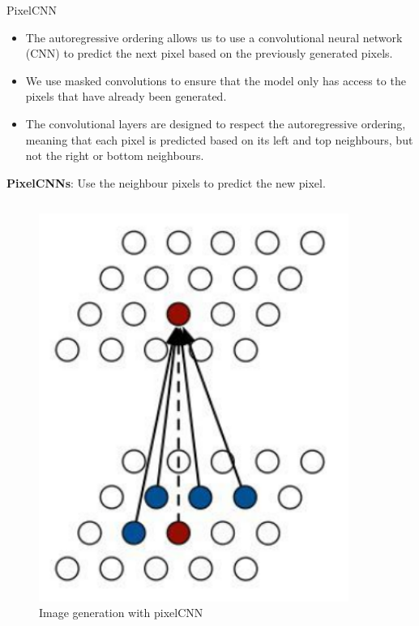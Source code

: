 \begin{frame}[allowframebreaks]{PixelCNN}
\framebreak
\begin{itemize}
    \item The autoregressive ordering allows us to use a convolutional neural network (CNN) to predict the next pixel based on the previously generated pixels.
    \item We use masked convolutions to ensure that the model only has access to the pixels that have already been generated.
    \item The convolutional layers are designed to respect the autoregressive ordering, meaning that each pixel is predicted based on its left and top neighbours, but not the right or bottom neighbours.
\end{itemize}
\framebreak
\textbf{PixelCNNs}: Use the neighbour pixels to predict the new pixel.
\begin{columns}
        \begin{column}{0.5\textwidth}
            \begin{figure}
                \centering
                \includegraphics[width=0.9\textwidth, keepaspectratio]{images/autoregressive/pixelcnn.png}
                \caption*{Image generation with pixelCNN}
            \end{figure}

\end{column}
\end{columns}
\end{frame}
